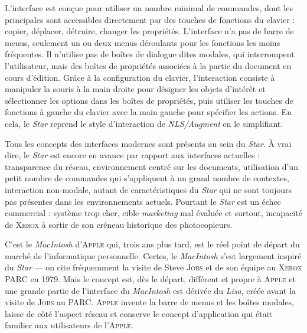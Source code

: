 L'interface est conçue pour utiliser un nombre minimal de commandes, dont les principales sont accessibles directement par des tou\-ches de fonctions du clavier : copier, déplacer, détruire, changer les propriétés. L'interface n'a pas de barre de menus, seulement un ou deux menus déroulants pour les fonctions les moins fréquentes. Il n'utilise pas de boîtes de dialogue dites modales, qui interrompent l'utilisateur, mais des boîtes de propriétés associées à la partie du document en cours d'édition. Grâce à la configuration du clavier, l'interaction consiste à manipuler la souris à la main droite pour désigner les objets d'intérêt et sélectionner les options dans les boîtes de propriétés, puis utiliser les touches de fonctions à gauche du clavier avec la main gauche pour spécifier les actions. En cela, le \textit{Star} reprend le style d'interaction de \textit{NLS/Augment} en le simplifiant.

Tous les concepts des interfaces modernes sont présents au sein du \textit{Star}. À vrai dire, le \textit{Star} est encore en avance par rapport aux interfaces actuelles : transparence du réseau, environnement centré sur les documents, utilisation d'un petit nombre de commandes qui s'appliquent à un grand nombre de contextes, interaction non-modale, autant de caractéristiques du \textit{Star} qui ne sont toujours pas présentes dans les environnements actuels. Pourtant le \textit{Star} est un échec commercial : système trop cher, cible \textit{marketing} mal évaluée et surtout, incapacité de \textsc{Xerox} à sortir de son créneau historique des photocopieurs.

C'est le \textit{MacIntosh} d'\textsc{Apple} qui, trois ans plus tard, est le réel point de départ du marché de l'informatique personnelle. Certes, le \textit{MacIntosh} s'est largement inspiré du \textit{Star}  --- on cite fréquemment la visite de Steve \textsc{Jobs} et de son équipe au \textsc{Xerox} PARC en 1979. Mais le concept est, dès le départ, différent et propre à \textsc{Apple} et une grande partie de l'interface du \textit{MacIntosh} est dérivée du \textit{Lisa}, créée avant la visite de \textsc{Jobs} au PARC. \textsc{Apple} invente la barre de menus et les boîtes modales, laisse de côté l'aspect réseau et conserve le concept d'application qui était familier aux utilisateurs de l'\textsc{Apple}. 

